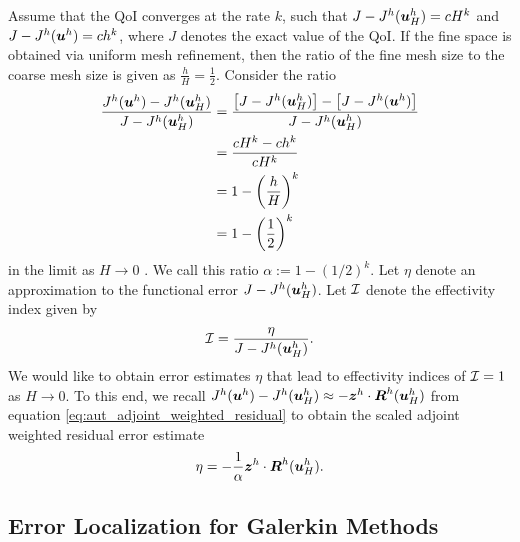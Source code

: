 Assume that the QoI converges at the rate $k$, such that
$J - J^h(\boldsymbol{u}^h_H) = c H^k$ and $J - J^h(\boldsymbol{u}^h) = ch^k$,
where $J$ denotes the exact value of the QoI. If the fine space
is obtained via uniform mesh refinement, then the ratio of the fine mesh size
to the coarse mesh size is given as $\frac{h}{H} = \frac12$. Consider the ratio
%
\begin{gather}
\begin{aligned}
\frac{ J^h (\boldsymbol{u}^h) - J^h(\boldsymbol{u}^h_H) }{ J - J^h(\boldsymbol{u}^h_H) }
&= \frac{\left[ J - J^h(\boldsymbol{u}^h_H) \right] -
\left[ J - J^h(\boldsymbol{u}^h) \right] }
{ J - J^h(\boldsymbol{u}^h_H) } \\
&= \frac{c H^k - ch^k}{c H^k} \\
&= 1 - \left( \frac{h}{H} \right)^k \\
&= 1 - \left( \frac12 \right)^k
\end{aligned}
\end{gather}
%
in the limit as $H \to 0$ \cite{fidkowski2011review}. We call this
ratio $\alpha := 1 - (1/2)^k$. Let $\eta$ denote an approximation
to the functional error $J - J^h(\boldsymbol{u}^h_H)$. Let $\mathcal{I}$
denote the effectivity index given by
%
\begin{gather}
\mathcal{I} = \frac{\eta}{ J - J^h(\boldsymbol{u}^h_H) }.
\label{eq:aut_effectivity}
\end{gather}
%
We would like to obtain error estimates $\eta$ that lead to
effectivity indices of $\mathcal{I} = 1$ as $H \to 0$. To this end, we recall
$J^h(\boldsymbol{u}^h) - J^h(\boldsymbol{u}^h_H) \approx - \boldsymbol{z}^h \cdot
\boldsymbol{R}^h(\boldsymbol{u}^h_H)$ from equation \eqref{eq:aut_adjoint_weighted_residual}
to obtain the scaled adjoint weighted residual error estimate
%
\begin{gather}
\eta = - \frac{1}{\alpha} \boldsymbol{z}^h \cdot \boldsymbol{R}^h(\boldsymbol{u}^h_H).
\label{eq:aut_error_estimate}
\end{gather}

\subsection{Error Localization for Galerkin Methods}

